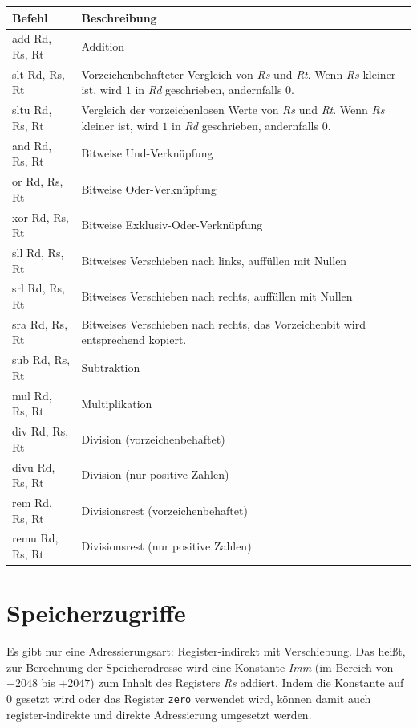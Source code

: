 \documentclass[a4paper,11pt]{article}
\begin{document}
	\begin{center}
		\begin{tabular}{>{\ttfamily}lp{11cm}}
			\toprule
			\normalfont\textbf{Befehl} & \textbf{Beschreibung} \\
			\midrule
			add  Rd, Rs, Rt & Addition \\
			slt  Rd, Rs, Rt & Vorzeichenbehafteter Vergleich von \textit{Rs} und \textit{Rt}.
								Wenn \textit{Rs} kleiner ist, wird $1$ in \textit{Rd} geschrieben, andernfalls $0$. \\
			sltu Rd, Rs, Rt & Vergleich der vorzeichenlosen Werte von \textit{Rs} und \textit{Rt}.
								Wenn \textit{Rs} kleiner ist, wird $1$ in \textit{Rd} geschrieben, andernfalls $0$. \\
			and  Rd, Rs, Rt & Bitweise Und-Verknüpfung \\
			or   Rd, Rs, Rt & Bitweise Oder-Verknüpfung \\
			xor  Rd, Rs, Rt & Bitweise Exklusiv-Oder-Verknüpfung \\
			sll  Rd, Rs, Rt & Bitweises Verschieben nach links, auffüllen mit Nullen \\
			srl  Rd, Rs, Rt & Bitweises Verschieben nach rechts, auffüllen mit Nullen \\
			sra  Rd, Rs, Rt & Bitweises Verschieben nach rechts, das Vorzeichenbit wird entsprechend kopiert. \\
			sub  Rd, Rs, Rt & Subtraktion \\
			mul  Rd, Rs, Rt & Multiplikation \\
			div  Rd, Rs, Rt & Division (vorzeichenbehaftet) \\
			divu Rd, Rs, Rt & Division (nur positive Zahlen) \\
			rem  Rd, Rs, Rt & Divisionsrest (vorzeichenbehaftet) \\
			remu Rd, Rs, Rt & Divisionsrest (nur positive Zahlen) \\
			\bottomrule
		\end{tabular}
	\end{center}
	
	\section{Speicherzugriffe}
	
	Es gibt nur eine Adressierungsart: Register-indirekt mit Verschiebung.
	Das heißt, zur Berechnung der Speicheradresse wird eine Konstante \textit{Imm} (im Bereich von $-2048$ bis $+2047$) zum Inhalt des Registers \textit{Rs} addiert.
	Indem die Konstante auf $0$ gesetzt wird oder das Register \texttt{zero} verwendet wird, können damit auch register-indirekte und direkte Adressierung umgesetzt werden.
	
\end{document}
